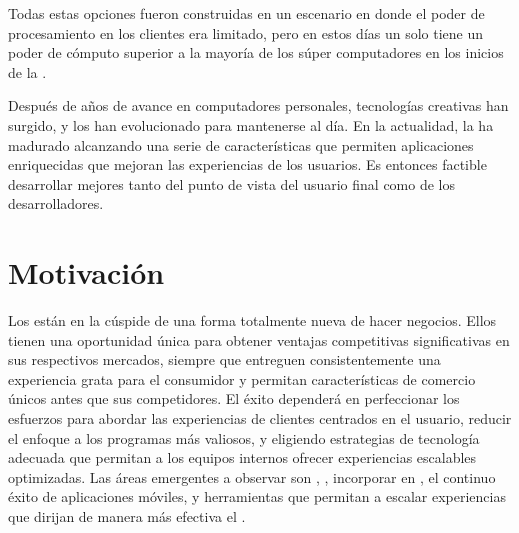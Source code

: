 			Todas estas opciones fueron construidas en un escenario en donde el poder de procesamiento en los clientes era limitado, pero en estos días un solo \iphone tiene un poder de cómputo superior a la mayoría de los súper computadores en los inicios de la \webINT. 

			Después de años de avance en computadores personales, tecnologías creativas han surgido, y los \webINT \browsersINT han evolucionado para mantenerse al día. En la actualidad, la \webINT ha madurado alcanzando una serie de características que permiten aplicaciones enriquecidas que mejoran las experiencias de los usuarios. Es entonces factible desarrollar \frameworksPC \ecommerceCOM mejores tanto del punto de vista del usuario final como de los desarrolladores.

	\section{Motivación}\label{cap:intro:motivacion}

		Los \online \retailers están en la cúspide de una forma totalmente nueva de hacer negocios. Ellos tienen una oportunidad única para obtener ventajas competitivas significativas en sus respectivos mercados, siempre que entreguen consistentemente una experiencia grata para el consumidor y permitan características de comercio \multichannel únicos antes que sus competidores. El éxito dependerá en perfeccionar los esfuerzos para abordar las experiencias de clientes centrados en el usuario, reducir el enfoque a los programas más valiosos, y eligiendo estrategias de tecnología adecuada que permitan a los equipos internos ofrecer experiencias escalables optimizadas. Las áreas emergentes a observar son \realTimeINT, \retail \analytics, incorporar \socialnetwork en \ecommerceCOM, el continuo éxito de aplicaciones móviles, y herramientas que permitan a \retailers escalar experiencias que dirijan de manera más efectiva el \merchandising.

